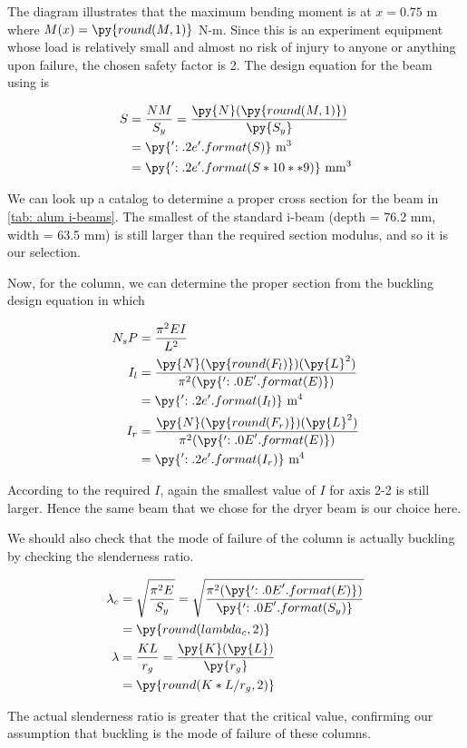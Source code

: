 \documentclass[
10pt,
a4paper,
openany,
svgnames,
]{book}
\begin{document}
\begin{solution}
  The diagram illustrates that the maximum bending moment is at $x = 0.75$ m where $M(x) = \py{round(M,1)}$ N-m. Since this is an experiment equipment whose load is relatively small and almost no risk of injury to anyone or anything upon failure, the chosen safety factor is 2. The design equation for the beam using    is

  \begin{align*}
    S &= \frac{N M}{S_y} = \frac{\py{N}(\py{round(M,1)})}{\py{S_y}} \\
      &= \py{'{:.2e}'.format(S)} \text{ m}^3 \\
      &= \py{'{:.2e}'.format(S*10**9)} \text{ mm}^3
  \end{align*}

  We can look up a catalog to determine a proper cross section for the beam in \cref{tab: alum i-beams}. The smallest of the standard i-beam (depth = 76.2 mm, width = 63.5 mm) is still larger than the required section modulus, and so it is our selection.

  Now, for the column, we can determine the proper section from the buckling design equation in which

  \begin{align*}
    N_s P &= \frac{\pi^2 EI}{L^2} \\
    I_l &= \frac{\py{N}(\py{round(F_l)})(\py{L}^2)}{\pi^2 (\py{'{:.0E}'.format(E)})} \\
          &= \py{'{:.2e}'.format(I_l)} \text{ m}^4 \\
    I_r &= \frac{\py{N}(\py{round(F_r)})(\py{L}^2)}{\pi^2 (\py{'{:.0E}'.format(E)})} \\
          &= \py{'{:.2e}'.format(I_r)} \text{ m}^4
  \end{align*}

  According to the required $I$, again the smallest value of $I$ for axis 2-2 is still larger. Hence the same beam that we chose for the dryer beam is our choice here.

  We should also check that the mode of failure of the column is actually buckling by checking the slenderness ratio.

  \begin{align*}
    \lambda_c &= \sqrt{ \frac{ \pi^2 E }{S_y}} = \sqrt{ \frac{ \pi^2 (\py{'{:.0E}'.format(E)}) }{\py{'{:.0E}'.format(S_y)}}} \\
              &= \py{round(lambda_c,2)} \\
    \lambda &= \frac{KL}{r_g} = \frac{\py{K}(\py{L})}{\py{r_g}} \\
              &= \py{round(K*L/r_g,2)}
  \end{align*}

  The actual slenderness ratio is greater that the critical value, confirming our assumption that buckling is the mode of failure of these columns.
\end{solution}
\end{document}

